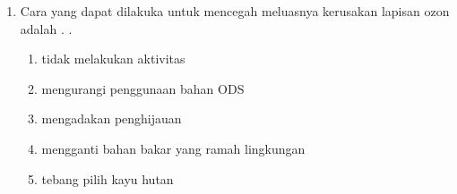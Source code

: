 \documentclass[10pt,a4paper]{extarticle}
\newcommand*\pilgan[1]{
\begin{enumerate}[label=\Alph*., itemsep=0pt,topsep=0pt,leftmargin=*,align=Center] #1 
\end{enumerate}}
\begin{document}
\begin{multicols}{3}
\begin{enumerate}
\item Cara yang dapat dilakuka untuk mencegah meluasnya kerusakan lapisan ozon adalah . . 
\pilgan{
   \item tidak melakukan aktivitas
   \item mengurangi penggunaan bahan ODS
   \item mengadakan penghijauan
   \item mengganti bahan bakar yang ramah lingkungan
   \item tebang pilih kayu hutan
}


\end{enumerate}
\end{multicols}
\end{document}
